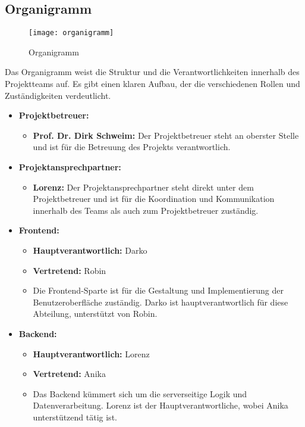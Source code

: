 \subsection{Organigramm}\label{subsec:Organigramm}

\begin{figure}[H]
    \centering
    \texttt{[image: organigramm]}
    \caption{Organigramm}
\end{figure}

Das Organigramm weist die Struktur und die Verantwortlichkeiten innerhalb des Projektteams auf.
Es gibt einen klaren Aufbau, der die verschiedenen Rollen und Zuständigkeiten verdeutlicht.

\begin{itemize}
    \item \textbf{Projektbetreuer:}
    \begin{itemize}
        \item \textbf{Prof. Dr. Dirk Schweim:} Der Projektbetreuer steht an oberster Stelle und ist für die Betreuung des Projekts verantwortlich.
    \end{itemize}

    \item \textbf{Projektansprechpartner:}
    \begin{itemize}
        \item \textbf{Lorenz:} Der Projektansprechpartner steht direkt unter dem Projektbetreuer und ist für die Koordination und Kommunikation innerhalb des Teams als auch zum Projektbetreuer zuständig.
    \end{itemize}

    \item \textbf{Frontend:}
    \begin{itemize}
        \item \textbf{Hauptverantwortlich:} Darko
        \item \textbf{Vertretend:} Robin
        \item Die Frontend-Sparte ist für die Gestaltung und Implementierung der Benutzeroberfläche zuständig.
        Darko ist hauptverantwortlich für diese Abteilung, unterstützt von Robin.
    \end{itemize}

    \item \textbf{Backend:}
    \begin{itemize}
        \item \textbf{Hauptverantwortlich:} Lorenz
        \item \textbf{Vertretend:} Anika
        \item Das Backend kümmert sich um die serverseitige Logik und Datenverarbeitung.
        Lorenz ist der Hauptverantwortliche, wobei Anika unterstützend tätig ist.
    \end{itemize}


\end{itemize}
